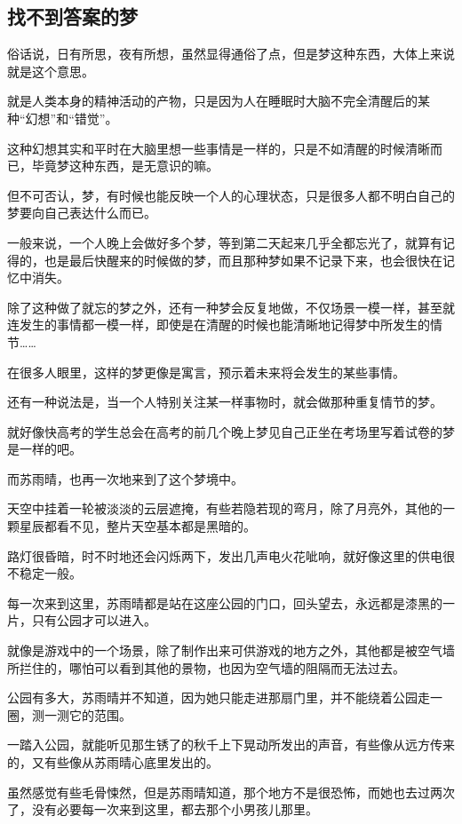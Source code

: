 \subsection{找不到答案的梦}

俗话说，日有所思，夜有所想，虽然显得通俗了点，但是梦这种东西，大体上来说就是这个意思。

就是人类本身的精神活动的产物，只是因为人在睡眠时大脑不完全清醒后的某种“幻想”和“错觉”。

这种幻想其实和平时在大脑里想一些事情是一样的，只是不如清醒的时候清晰而已，毕竟梦这种东西，是无意识的嘛。

但不可否认，梦，有时候也能反映一个人的心理状态，只是很多人都不明白自己的梦要向自己表达什么而已。

一般来说，一个人晚上会做好多个梦，等到第二天起来几乎全都忘光了，就算有记得的，也是最后快醒来的时候做的梦，而且那种梦如果不记录下来，也会很快在记忆中消失。

除了这种做了就忘的梦之外，还有一种梦会反复地做，不仅场景一模一样，甚至就连发生的事情都一模一样，即使是在清醒的时候也能清晰地记得梦中所发生的情节……

在很多人眼里，这样的梦更像是寓言，预示着未来将会发生的某些事情。

还有一种说法是，当一个人特别关注某一样事物时，就会做那种重复情节的梦。

就好像快高考的学生总会在高考的前几个晚上梦见自己正坐在考场里写着试卷的梦是一样的吧。

而苏雨晴，也再一次地来到了这个梦境中。

天空中挂着一轮被淡淡的云层遮掩，有些若隐若现的弯月，除了月亮外，其他的一颗星辰都看不见，整片天空基本都是黑暗的。

路灯很昏暗，时不时地还会闪烁两下，发出几声电火花呲响，就好像这里的供电很不稳定一般。

每一次来到这里，苏雨晴都是站在这座公园的门口，回头望去，永远都是漆黑的一片，只有公园才可以进入。

就像是游戏中的一个场景，除了制作出来可供游戏的地方之外，其他都是被空气墙所拦住的，哪怕可以看到其他的景物，也因为空气墙的阻隔而无法过去。

公园有多大，苏雨晴并不知道，因为她只能走进那扇门里，并不能绕着公园走一圈，测一测它的范围。

一踏入公园，就能听见那生锈了的秋千上下晃动所发出的声音，有些像从远方传来的，又有些像从苏雨晴心底里发出的。

虽然感觉有些毛骨悚然，但是苏雨晴知道，那个地方不是很恐怖，而她也去过两次了，没有必要每一次来到这里，都去那个小男孩儿那里。

